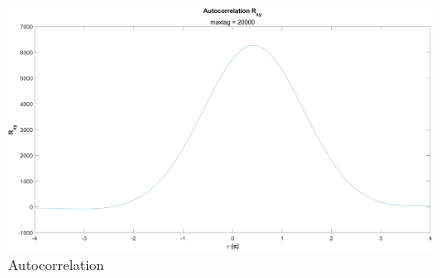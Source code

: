 \documentclass[12pt]{article}
\begin{document}
\begin{figure}[h]
	\centering
	\includegraphics[width=\textwidth]{exp3_autocorr}
	\caption{\label{fig:exp3_autocorr}Autocorrelation}
\end{figure}
\end{document}
